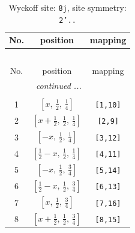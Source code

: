 \documentclass[fleqn,8pt]{jsarticle}
\begin{document}
\begin{longtable}{ccc}
\caption{Wyckoff site: {\tt 8j}, site symmetry: {\tt 2'..}}
 \\
 \hline \hline
No. & position & mapping \\ \hline \endfirsthead

\multicolumn{2}{l}{\tablename\ \thetable{}} \\
 \hline \hline
No. & position & mapping \\ \hline \endhead

 \hline \hline
\multicolumn{2}{r}{\footnotesize\it continued ...} \\ \endfoot

 \hline \hline
\multicolumn{2}{r}{} \\ \endlastfoot

1 & $\left[ x,\, \frac{1}{2},\, \frac{1}{4} \right]$ & {\tt [1,10]} \\ \hline
2 & $\left[ x + \frac{1}{2},\, \frac{1}{2},\, \frac{1}{4} \right]$ & {\tt [2,9]} \\ \hline
3 & $\left[ - x,\, \frac{1}{2},\, \frac{1}{4} \right]$ & {\tt [3,12]} \\ \hline
4 & $\left[ \frac{1}{2} - x,\, \frac{1}{2},\, \frac{1}{4} \right]$ & {\tt [4,11]} \\ \hline
5 & $\left[ - x,\, \frac{1}{2},\, \frac{3}{4} \right]$ & {\tt [5,14]} \\ \hline
6 & $\left[ \frac{1}{2} - x,\, \frac{1}{2},\, \frac{3}{4} \right]$ & {\tt [6,13]} \\ \hline
7 & $\left[ x,\, \frac{1}{2},\, \frac{3}{4} \right]$ & {\tt [7,16]} \\ \hline
8 & $\left[ x + \frac{1}{2},\, \frac{1}{2},\, \frac{3}{4} \right]$ & {\tt [8,15]} \\
\end{longtable}
\renewcommand{\arraystretch}{1.2}
\end{document}
